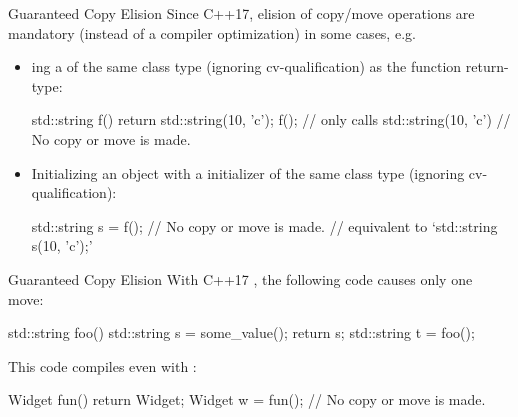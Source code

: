 \begin{frame}[fragile]{Guaranteed Copy Elision}
  Since C++17, elision of copy/move operations are mandatory (instead of a compiler optimization) in some cases, e.g.
  \begin{itemize}
    \item {}ing a  of the same class type (ignoring cv-qualification) as the function return-type:
    \begin{cpp}
std::string f() {
  return std::string(10, 'c');
}
f(); // only calls std::string(10, 'c')
     // No copy or move is made.
    \end{cpp}
    \item Initializing an object with a  initializer of the same class type (ignoring cv-qualification):
    \begin{cpp}
std::string s = f(); // No copy or move is made.
// equivalent to `std::string s(10, 'c');'
    \end{cpp}
  \end{itemize}
\end{frame}

\begin{frame}[fragile]{Guaranteed Copy Elision}
  With C++17 , the following code causes only one move:
  \begin{cpp}
std::string foo() {
  std::string s = some_value();
  return s;
}
std::string t = foo();
  \end{cpp}
  \pause
  This code compiles even with :
  \begin{cpp}
Widget fun() {
  return Widget{};
}
Widget w = fun(); // No copy or move is made.
  \end{cpp}
\end{frame}